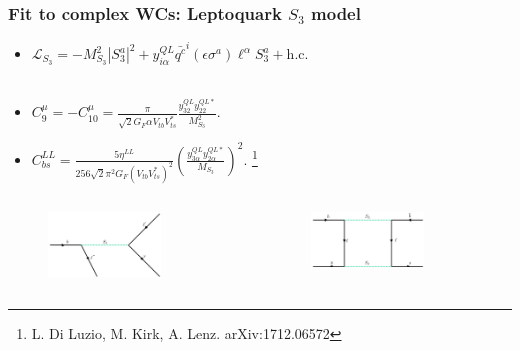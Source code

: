 \documentclass[mathserif, 10pt]{beamer}
\begin{document}
\begin{frame}\frametitle{Fit to complex WCs: Leptoquark $S_3$ model}
    \begin{itemize}
        \item $\mathcal{L}_{S_3} = -M^2_{S_3} |S_3^a|^2 + y_{i\alpha}^{QL} \bar{q^c}^i (\epsilon \sigma^a) \ell^\alpha S_3^a  + \mathrm{h.c.}$~\\~\\
        \item $C_9^\mu = -C_{10}^\mu = \frac{\pi}{\sqrt{2} G_F \alpha V_{tb} V_{ts}^*} \frac{y^{QL}_{32} y^{QL*}_{22}}{M^2_{S_3}}$.
        \item $C_{bs}^{LL} = \frac{5\eta^{LL}}{256 \sqrt{2} \pi^2 G_F (V_{tb} V_{ts}^*)^2}\left(\frac{y^{QL}_{3\alpha} y^{QL*}_{2\alpha}}{M_{S_3}}\right)^2$. \footnote[4]{L. Di Luzio, M. Kirk, A. Lenz. arXiv:1712.06572}
    \end{itemize}

    \begin{columns}
        \begin{column}[t]{0.48\textwidth}
            \begin{figure}
                \includegraphics[width=0.7\textwidth]{figures/feynLQLFUV.png}
            \end{figure}
        \end{column}
        \begin{column}[t]{0.48\textwidth}
            \begin{figure}
                \includegraphics[width=0.7\textwidth]{figures/feynLQBs.png}
            \end{figure}
        \end{column}
    \end{columns}
\end{frame}
\end{document}
